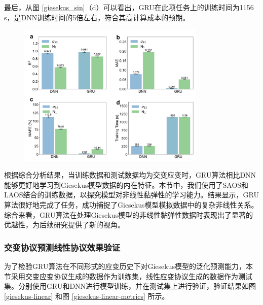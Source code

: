 最后，从图 \ref{giesekus_sin}（d）可以看出，GRU在此项任务上的训练时间为1156 s，是DNN训练时间的5倍左右，符合其高计算成本的预期。
\begin{figure}[htbp]
  \centering
  \includegraphics[width=0.8\textwidth]{Fig/giesekus-sin-metrics.pdf}
  \FigureBicaption{\label{giesekus-sin-metrics}}{}
\end{figure}
根据综合分析结果，当训练数据和测试数据均为交变应变时，GRU算法相比DNN能够更好地学习到Giesekus模型数据的内在特征。本节中，我们使用了SAOS和LAOS结合的训练数据，以探究模型对非线性黏弹性的学习能力。结果显示，GRU算法很好地完成了任务，成功捕捉了Giesekus模型模拟数据中的复杂非线性关系。综合来看，GRU算法在处理Giesekus模型的非线性黏弹性数据时表现出了显著的优越性，为后续研究提供了新的视角。

\subsubsection{交变协议预测线性协议效果验证}
为了检验GRU算法在不同形式的应变历史下对Giesekus模型的泛化预测能力，本节采用交变应变协议生成的数据作为训练集，线性应变协议生成的数据作为测试集。分别使用GRU和DNN进行模型训练，并在测试集上进行验证，验证结果如图 \ref{giesekus-linear} 和图 \ref{giesekus-linear-metrics} 所示。

